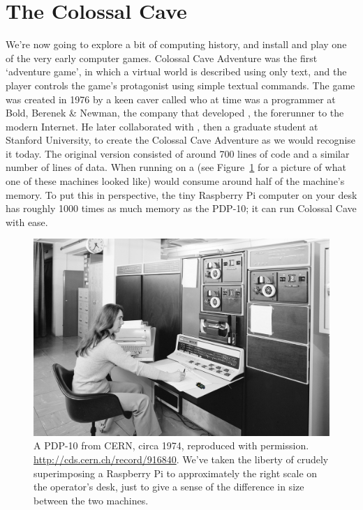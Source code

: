 \section{The Colossal Cave}

We're now going to explore a bit of computing history, and install and play one of the very early computer games. Colossal Cave Adventure was the first `adventure game', in which a virtual world is described using only text, and the player controls the game's protagonist using simple textual commands. The game was created in 1976 by a keen caver called  who at time was a programmer at Bold, Berenek \& Newman, the company that developed , the forerunner to the modern Internet. He later collaborated with , then a graduate student at Stanford University, to create the Colossal Cave Adventure as we would recognise it today. The original version consisted of around 700 lines of  code and a similar number of lines of data. When running on a  (see Figure~\ref{figure:cern-pdp-10} for a picture of what one of these machines looked like) would consume around half of the machine's memory. To put this in perspective, the tiny Raspberry Pi computer on your desk has roughly 1000 times as much memory as the PDP-10; it can run Colossal Cave with ease. 

\begin{figure}[t]
\centerline{\includegraphics[width=14cm]{images/cern-pdp10+pi.png}}
\caption{A PDP-10 from CERN, circa 1974, reproduced with permission. \url{http://cds.cern.ch/record/916840}. We've taken the liberty of crudely superimposing a Raspberry Pi to approximately the right scale on the operator's desk, just to give a sense of the difference in size between the two machines.}\label{figure:cern-pdp-10}
\end{figure}

